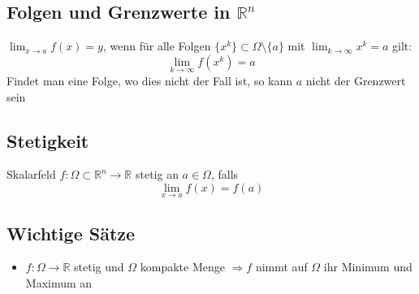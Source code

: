 \subsection{Folgen und Grenzwerte in $\mathbb R^n$}
$\lim_{x\rightarrow a}f(x)=y$, wenn für alle Folgen $\{x^k\} \subset \Omega \setminus \{a\}$ mit $\lim_{k\rightarrow \infty}x^k=a$ gilt:
\begin{equation*}
    \lim_{k\rightarrow \infty}f(x^k)=a
\end{equation*}
Findet man eine Folge, wo dies nicht der Fall ist, so kann $a$ nicht der Grenzwert sein

\subsection{Stetigkeit}
Skalarfeld $f:\Omega \subset \mathbb R^n \rightarrow \mathbb R$ stetig an $a \in \Omega$, falls
\begin{equation*}
    \lim_{x\rightarrow a}f(x)=f(a)
\end{equation*}

\subsection{Wichtige Sätze}
\begin{itemize}
    \item $f:\Omega \rightarrow \mathbb R$ stetig und $\Omega$ kompakte Menge $\Longrightarrow f$ nimmt auf $\Omega$ ihr Minimum und Maximum an
\end{itemize}